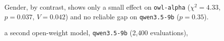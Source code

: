 
Gender, by contrast, shows only a small effect on \texttt{owl-alpha} ($\chi^2=4.33$, $p=0.037$, $V=0.042$) and no reliable gap on \texttt{qwen3.5-9b} ($p=0.35$).

a second open-weight model, \texttt{qwen3.5-9b} (2{,}400 evaluations),